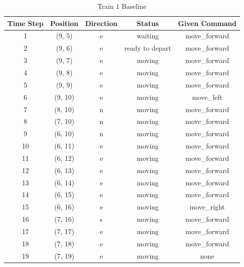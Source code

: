 \begin{table}
\centering
\scriptsize
\caption{Train 1 Baseline}
\label{tab:base1}
\begin{tabular}{c c c c c}
\hline
\textbf{Time Step} & \textbf{Position} & \textbf{Direction} & \textbf{Status} & \textbf{Given Command} \\
\hline
1 & (9, 5) & e & waiting & move\_forward \\
2 & (9, 6) & e & ready to depart & move\_forward \\
3 & (9, 7) & e & moving & move\_forward \\
4 & (9, 8) & e & moving & move\_forward \\
5 & (9, 9) & e & moving & move\_forward \\
6 & (9, 10) & e & moving & move\_left \\
7 & (8, 10) & n & moving & move\_forward \\
8 & (7, 10) & n & moving & move\_forward \\
9 & (6, 10) & n & moving & move\_forward \\
10 & (6, 11) & e & moving & move\_forward \\
11 & (6, 12) & e & moving & move\_forward \\
12 & (6, 13) & e & moving & move\_forward \\
13 & (6, 14) & e & moving & move\_forward \\
14 & (6, 15) & e & moving & move\_forward \\
15 & (6, 16) & e & moving & move\_right \\
16 & (7, 16) & s & moving & move\_forward \\
17 & (7, 17) & e & moving & move\_forward \\
18 & (7, 18) & e & moving & move\_forward \\
19 & (7, 19) & e & moving &  none \\
\hline
\end{tabular}
\end{table}